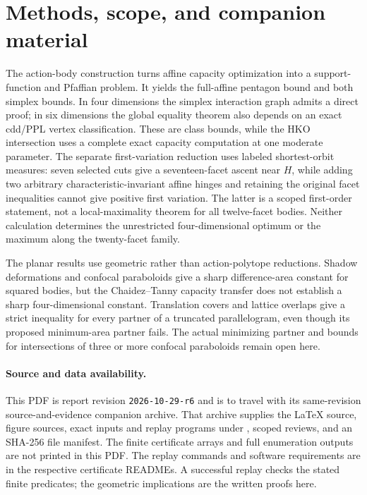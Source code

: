 \documentclass[a4paper,11pt]{article}
\theoremstyle{definition}
\theoremstyle{remark}
\begin{document}







\clearpage
\section{Methods, scope, and companion material}

The action-body construction turns affine capacity optimization into a
support-function and Pfaffian problem. It yields the full-affine pentagon
bound and both simplex bounds. In four dimensions the simplex interaction
graph admits a direct proof; in six dimensions the global equality theorem
also depends on an exact cdd/PPL vertex classification. These are class
bounds, while the HKO intersection uses a complete exact capacity computation
at one moderate parameter. The separate first-variation reduction uses
labeled shortest-orbit measures: seven selected cuts give a seventeen-facet
ascent near $H$, while adding two arbitrary characteristic-invariant affine
hinges and retaining the original facet inequalities cannot give positive
first variation. The latter is a scoped first-order
statement, not a local-maximality theorem for all twelve-facet bodies.
Neither calculation determines the unrestricted
four-dimensional optimum or the maximum along the twenty-facet family.

The planar results use geometric rather than action-polytope reductions.
Shadow deformations and confocal paraboloids give a sharp difference-area
constant for squared bodies, but the Chaidez--Tanny capacity transfer does
not establish a sharp four-dimensional constant. Translation covers and
lattice overlaps give a strict inequality for every partner of a truncated
parallelogram, even though its proposed minimum-area partner fails. The
actual minimizing partner and bounds for intersections of three or more
confocal paraboloids remain open here.

\paragraph{Source and data availability.}
This PDF is report revision \texttt{2026-10-29-r6} and is to travel with its
same-revision source-and-evidence companion archive. That archive supplies
the LaTeX source, figure sources, exact inputs and replay programs under
, scoped reviews, and an SHA-256 file manifest. The
finite certificate arrays and full enumeration outputs are not printed in
this PDF. The replay commands and software requirements are in the
respective certificate READMEs. A successful replay checks the stated
finite predicates; the geometric implications are the written proofs here.

\clearpage
\appendix






\end{document}
